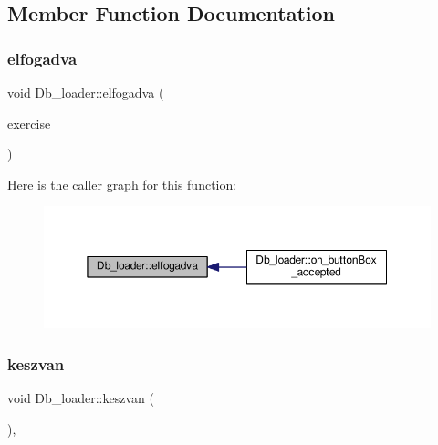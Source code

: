 \subsection{Member Function Documentation}
\mbox{\label{classDb__loader_ac2b4287582e909c978a7ef903080a791}} 
\subsubsection{\texorpdfstring{elfogadva}{elfogadva}}
{\footnotesize\ttfamily void Db\+\_\+loader\+::elfogadva (\begin{DoxyParamCaption}\item[{Q\+Standard\+Item\+Model $\ast$}]{exercise }\end{DoxyParamCaption})\hspace{0.3cm}{\ttfamily [signal]}}

Here is the caller graph for this function\+:\nopagebreak
\begin{figure}[H]
\begin{center}
\leavevmode
\includegraphics[width=350pt]{classDb__loader_ac2b4287582e909c978a7ef903080a791_icgraph}
\end{center}
\end{figure}
\mbox{\label{classDb__loader_a3d308bb09c20a83faa4da10aae8bca27}} 
\subsubsection{\texorpdfstring{keszvan}{keszvan}}
{\footnotesize\ttfamily void Db\+\_\+loader\+::keszvan (\begin{DoxyParamCaption}{ }\end{DoxyParamCaption})\hspace{0.3cm}{\ttfamily [private]}, {\ttfamily [slot]}}



